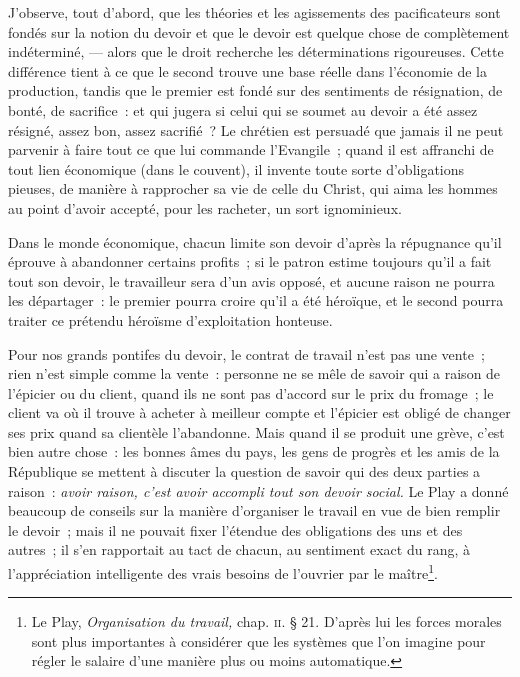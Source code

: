 \documentclass[french,twoside]{book} %
\begin{document}
\noindent J’observe, tout d’abord, que les théories et les agissements des pacificateurs sont fondés sur la notion du devoir et que le devoir est quelque chose de complètement indéterminé, — alors que le droit recherche les déterminations rigoureuses. Cette différence tient à ce que le second trouve une base réelle dans l’économie de la production,  tandis que le premier est fondé sur des sentiments de résignation, de bonté, de sacrifice : et qui jugera si celui qui se soumet au devoir a été assez résigné, assez bon, assez sacrifié ? Le chrétien est persuadé que jamais il ne peut parvenir à faire tout ce que lui commande l’Evangile ; quand il est affranchi de tout lien économique (dans le couvent), il invente toute sorte d’obligations pieuses, de manière à rapprocher sa vie de celle du Christ, qui aima les hommes au point d’avoir accepté, pour les racheter, un sort ignominieux.\par
Dans le monde économique, chacun limite son devoir d’après la répugnance qu’il éprouve à abandonner certains profits ; si le patron estime toujours qu’il a fait tout son devoir, le travailleur sera d’un avis opposé, et aucune raison ne pourra les départager : le premier pourra croire qu’il a été héroïque, et le second pourra traiter ce prétendu héroïsme d’exploitation honteuse.\par
Pour nos grands pontifes du devoir, le contrat de travail n’est pas une vente ; rien n’est simple comme la vente : personne ne se mêle de savoir qui a raison de l’épicier ou du client, quand ils ne sont pas d’accord sur le prix du fromage ; le client va où il trouve à acheter à meilleur compte et l’épicier est obligé de changer ses prix quand sa clientèle l’abandonne. Mais quand il se produit une grève, c’est bien autre chose : les bonnes âmes du pays, les gens de progrès et les amis de la République se mettent à discuter la question de savoir qui des deux parties a raison : \emph{avoir raison, c’est avoir accompli tout son devoir social.} Le Play a donné beaucoup de conseils sur la manière d’organiser le travail en vue de bien remplir le devoir ; mais il ne pouvait fixer l’étendue des  obligations des uns et des autres ; il s’en rapportait au tact de chacun, au sentiment exact du rang, à l’appréciation intelligente des vrais besoins de l’ouvrier par le maître\footnote{ \noindent Le Play, \emph{Organisation du travail,} chap. {\scshape ii}. § 21. D’après lui les forces morales sont plus importantes à considérer que les systèmes que l’on imagine pour régler le salaire d’une manière plus ou moins automatique.
 }.\par
\end{document}
